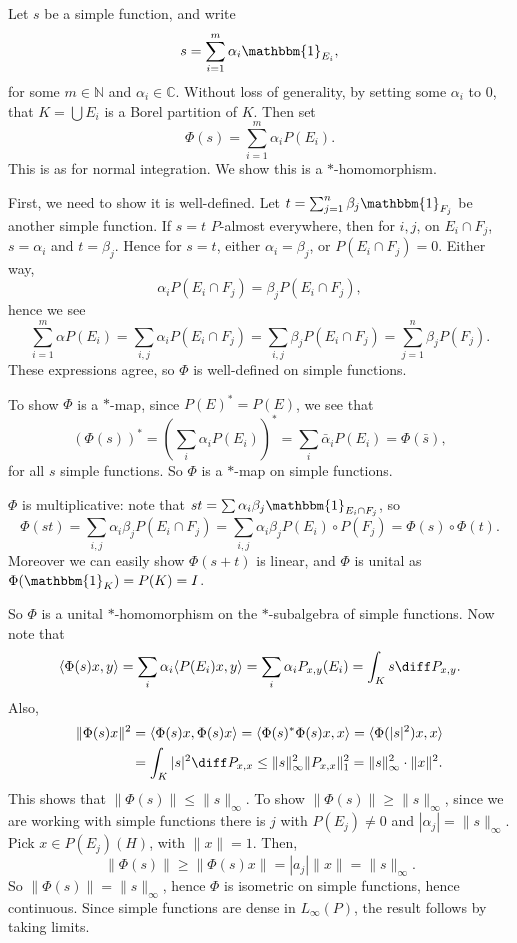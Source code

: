 \documentclass[12pt]{article}
\begin{document}
\begin{proofbox}
	Let $s$ be a simple function, and write
	\[
	s = \sum_{i = 1}^m \alpha_i \mathbbm{1}_{E_i},
	\]
	for some $m \in \mathbb{N}$ and $\alpha_i \in \mathbb{C}$. Without loss of generality, by setting some $\alpha_i$ to $0$, that $K = \bigcup E_i$ is a Borel partition of $K$. Then set
	\[
	\Phi(s) = \sum_{i = 1}^m \alpha_i P(E_i).
	\]
	This is as for normal integration. We show this is a $\ast$-homomorphism.

	First, we need to show it is well-defined. Let $t = \sum_{j = 1}^n \beta_j \mathbbm{1}_{F_j}$ be another simple function. If $s = t$ $P$-almost everywhere, then for $i, j$, on $E_i \cap F_j$, $s = \alpha_i$ and $t = \beta_j$. Hence for $s = t$, either $\alpha_i = \beta_j$, or $P(E_i \cap F_j) = 0$. Either way,
	\[
	\alpha_i P(E_i \cap F_j) = \beta_j P(E_i \cap F_j),
	\]
	hence we see
	\[
	\sum_{i = 1}^m \alpha P(E_i) = \sum_{i, j} \alpha_i P(E_i \cap F_j) = \sum_{i, j} \beta_j P(E_i \cap F_j) = \sum_{j = 1}^n \beta_j P(F_j).
	\]
	These expressions agree, so $\Phi$ is well-defined on simple functions.

	To show $\Phi$ is a $\ast$-map, since $P(E)^{\ast} = P(E)$, we see that
	\[
		(\Phi(s))^{\ast} = \left( \sum_{i} \alpha_i P(E_i) \right)^{\ast} = \sum_i \bar \alpha_i P(E_i) = \Phi(\bar s),
	\]
	for all $s$ simple functions. So $\Phi$ is a $\ast$-map on simple functions.

	$\Phi$ is multiplicative: note that $st = \sum \alpha_i \beta_j \mathbbm{1}_{E_i \cap F_j}$, so
	\[
	\Phi(st) = \sum_{i, j} \alpha_i \beta_j  P(E_i \cap F_j) = \sum_{i, j} \alpha_i \beta_j P(E_i) \circ P(F_j) = \Phi(s) \circ \Phi(t).
	\]
	Moreover we can easily show $\Phi(s + t)$ is linear, and $\Phi$ is unital as $\Phi(\mathbbm{1}_{K}) = P(K) = I$.

	So $\Phi$ is a unital $\ast$-homomorphism on the $\ast$-subalgebra of simple functions. Now note that
	\[
	\langle \Phi(s) x, y \rangle = \sum_i \alpha_i \langle P(E_i) x, y \rangle = \sum_i \alpha_i P_{x,y}(E_i) = \int_K s \diff P_{x,y}.
	\]
	Also,
	\begin{align*}
		\|\Phi(s) x\|^2 &= \langle \Phi(s) x, \Phi(s) x\rangle = \langle \Phi(s)^{\ast} \Phi(s) x, x \rangle = \langle \Phi(|s|^2) x, x \rangle \\
				&= \int_K |s|^2 \diff P_{x, x} \leq \|s\|^2_\infty \|P_{x,x}\|_1^2 = \|s\|_\infty^2 \cdot \|x\|^2.
	\end{align*}
	This shows that $\|\Phi(s)\| \leq \|s\|_\infty$. To show $\|\Phi(s)\| \geq \|s\|_\infty$, since we are working with simple functions there is $j$ with $P(E_j) \neq 0$ and $|\alpha_j| = \|s\|_\infty$. Pick $x \in P(E_j)(H)$, with $\|x\| = 1$. Then,
	\[
	\|\Phi(s)\| \geq \|\Phi(s) x\| = |a_j| \|x\| = \|s\|_\infty.
	\]
	So $\|\Phi(s)\| = \|s\|_\infty$, hence $\Phi$ is isometric on simple functions, hence continuous. Since simple functions are dense in $L_\infty(P)$, the result follows by taking limits.
\end{proofbox}
\end{document}
